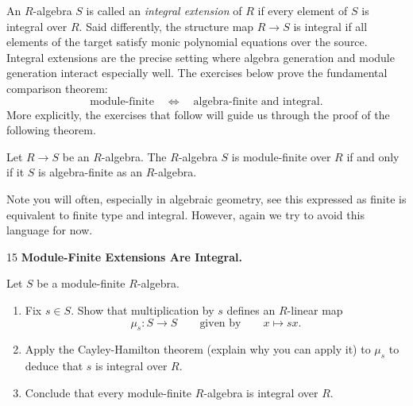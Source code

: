 \documentclass[Notebook.tex]{subfiles}
\begin{document}
\newpage 

\hrulefill

An $R$-algebra $S$ is called an \emph{integral extension} of $R$ if every element of $S$ is integral over $R$. Said differently, the structure map $R\to S$ is integral if all elements of the target satisfy monic polynomial equations over the source. Integral extensions are the precise setting where algebra generation and module generation interact especially well. The exercises below prove the fundamental comparison theorem:
\[
\boxed{\text{module-finite}}\quad \Longleftrightarrow\quad \boxed{\text{algebra-finite and integral}}.
\]
More explicitly, the exercises that follow will guide us through the proof of the following theorem. 

\begin{theorem}
Let $R\to S$ be an $R$-algebra.  The  $R$-algebra $S$ is module-finite over $R$ if and only if it $S$ is algebra-finite as an $R$-algebra. 
\end{theorem}

Note you will often, especially in algebraic geometry, see this expressed as finite is equivalent to finite type and integral. However, again we try to avoid this language for now. 

\hrulefill

\newpage 

\begin{problem}{15}
    \textbf{Module-Finite Extensions Are Integral.} 
    
    Let $S$ be a module-finite $R$-algebra.
    \begin{enumerate}
        \item Fix $s\in S$. Show that multiplication by $s$ defines an $R$-linear map
        \[
        \mu_s:S\longrightarrow S
        \qquad \text{given by} \qquad
        x\longmapsto sx.
        \]
        \item Apply the Cayley-Hamilton theorem (explain why you can apply it) to $\mu_{s}$ to deduce that $s$ is integral over $R$.
        \item Conclude that every module-finite $R$-algebra is integral over $R$.
    \end{enumerate}
\end{problem}
\end{document}
